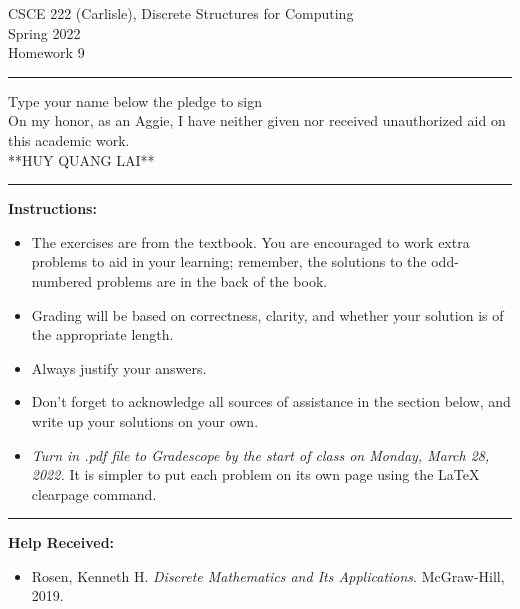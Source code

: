 \documentclass[12pt]{article}  %
\begin{document}
\begin{center}         %
{\large                %
CSCE 222 (Carlisle), Discrete Structures for Computing \\  %
Spring 2022 \\
Homework 9}
\end{center}
\rule{6in}{.1pt}       %
\begin{center}
{\large
Type your name below the pledge to sign\\
On my honor, as an Aggie, I have neither given nor received unauthorized aid on this academic work.\\
**HUY QUANG LAI**}
\end{center}


\rule{6in}{.1pt}       %
                    
\noindent              %
{\bf Instructions:}    %

\begin{itemize}        %
\item The exercises are from the textbook.  You are encouraged to work
      extra problems to aid in your learning; remember, the solutions to 
      the odd-numbered problems are in the back of the book.
\item Grading will be based on correctness, clarity, and whether your
      solution is of the appropriate length.
\item Always justify your answers.
\item Don't forget to acknowledge all sources of assistance in the section below, and write up your solutions on your own.
\item {\em Turn in .pdf file to Gradescope by the start of class on Monday, March 28, 2022.}  It is simpler to put each problem on its own page using the LaTeX clearpage command.
\end{itemize}


\rule{6in}{.1pt}       %

{\bf Help Received:}    %
\begin{itemize}
\item Rosen, Kenneth H. \textit{Discrete Mathematics and Its Applications}. McGraw-Hill, 2019.
\end{itemize}
\end{document}
